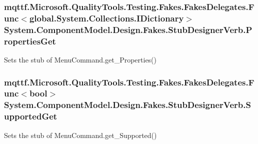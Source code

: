 \hypertarget{class_system_1_1_component_model_1_1_design_1_1_fakes_1_1_stub_designer_verb_a3b68711e67dd874aade9ef8eb9aa0236}{
\subsubsection[{Properties\-Get}]{\setlength{\rightskip}{0pt plus 5cm}mqttf.\-Microsoft.\-Quality\-Tools.\-Testing.\-Fakes.\-Fakes\-Delegates.\-Func$<$global.\-System.\-Collections.\-I\-Dictionary$>$ System.\-Component\-Model.\-Design.\-Fakes.\-Stub\-Designer\-Verb.\-Properties\-Get}}\label{class_system_1_1_component_model_1_1_design_1_1_fakes_1_1_stub_designer_verb_a3b68711e67dd874aade9ef8eb9aa0236}


Sets the stub of Menu\-Command.\-get\-\_\-\-Properties()

\hypertarget{class_system_1_1_component_model_1_1_design_1_1_fakes_1_1_stub_designer_verb_a5b187ddf86986c37d685cbd4b90d01c0}{
\subsubsection[{Supported\-Get}]{\setlength{\rightskip}{0pt plus 5cm}mqttf.\-Microsoft.\-Quality\-Tools.\-Testing.\-Fakes.\-Fakes\-Delegates.\-Func$<$bool$>$ System.\-Component\-Model.\-Design.\-Fakes.\-Stub\-Designer\-Verb.\-Supported\-Get}}\label{class_system_1_1_component_model_1_1_design_1_1_fakes_1_1_stub_designer_verb_a5b187ddf86986c37d685cbd4b90d01c0}


Sets the stub of Menu\-Command.\-get\-\_\-\-Supported()

